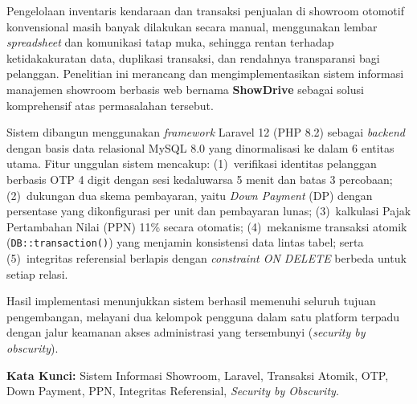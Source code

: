 \documentclass[11pt, a5paper]{article}
\begin{document}
\vspace{0.5cm}

Pengelolaan inventaris kendaraan dan transaksi penjualan di showroom otomotif
konvensional masih banyak dilakukan secara manual, menggunakan lembar
\textit{spreadsheet} dan komunikasi tatap muka, sehingga rentan terhadap
ketidakakuratan data, duplikasi transaksi, dan rendahnya transparansi bagi
pelanggan. Penelitian ini merancang dan mengimplementasikan sistem informasi
manajemen showroom berbasis web bernama \textbf{ShowDrive} sebagai solusi
komprehensif atas permasalahan tersebut.

Sistem dibangun menggunakan \textit{framework} Laravel 12 (PHP 8.2) sebagai
\textit{backend} dengan basis data relasional MySQL 8.0 yang dinormalisasi ke
dalam 6 entitas utama. Fitur unggulan sistem mencakup: (1)~verifikasi identitas
pelanggan berbasis OTP 4 digit dengan sesi kedaluwarsa 5 menit dan batas 3
percobaan; (2)~dukungan dua skema pembayaran, yaitu \textit{Down Payment} (DP)
dengan persentase yang dikonfigurasi per unit dan pembayaran lunas; (3)~kalkulasi
Pajak Pertambahan Nilai (PPN) 11\% secara otomatis; (4)~mekanisme transaksi
atomik (\texttt{DB::transaction()}) yang menjamin konsistensi data lintas tabel;
serta (5)~integritas referensial berlapis dengan \textit{constraint ON DELETE}
berbeda untuk setiap relasi.

Hasil implementasi menunjukkan sistem berhasil memenuhi seluruh tujuan
pengembangan, melayani dua kelompok pengguna dalam satu platform terpadu dengan
jalur keamanan akses administrasi yang tersembunyi (\textit{security by
obscurity}).

\vspace{0.4cm}
\noindent\textbf{Kata Kunci:} Sistem Informasi Showroom, Laravel, Transaksi
Atomik, OTP, Down Payment, PPN, Integritas Referensial, \textit{Security by
Obscurity}.

\newpage
\tableofcontents

\newpage
\listoffigures
{}

\newpage
{}
\setcounter{page}{1}
\end{document}
